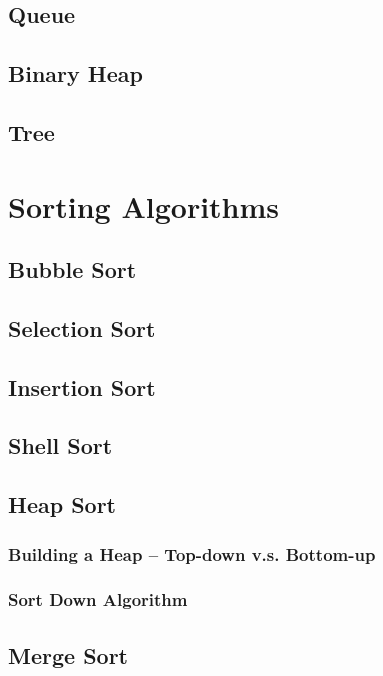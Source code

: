 \documentclass{report}
\begin{document}
\section{Queue}

\section{Binary Heap}

\section{Tree}


\chapter{Sorting Algorithms}

\section{Bubble Sort}

\section{Selection Sort}

\section{Insertion Sort}

\section{Shell Sort}

\section{Heap Sort}

\subsection{Building a Heap -- Top-down v.s. Bottom-up}

\subsection{Sort Down Algorithm}

\section{Merge Sort}
\end{document}
